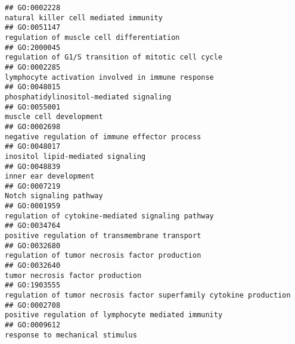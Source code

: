 \documentclass[
]{article}
\begin{document}
\begin{verbatim}
## GO:0002228                                                                                                            natural killer cell mediated immunity
## GO:0051147                                                                                                        regulation of muscle cell differentiation
## GO:2000045                                                                                              regulation of G1/S transition of mitotic cell cycle
## GO:0002285                                                                                                lymphocyte activation involved in immune response
## GO:0048015                                                                                                          phosphatidylinositol-mediated signaling
## GO:0055001                                                                                                                          muscle cell development
## GO:0002698                                                                                                   negative regulation of immune effector process
## GO:0048017                                                                                                                inositol lipid-mediated signaling
## GO:0048839                                                                                                                            inner ear development
## GO:0007219                                                                                                                          Notch signaling pathway
## GO:0001959                                                                                                regulation of cytokine-mediated signaling pathway
## GO:0034764                                                                                                   positive regulation of transmembrane transport
## GO:0032680                                                                                                   regulation of tumor necrosis factor production
## GO:0032640                                                                                                                 tumor necrosis factor production
## GO:1903555                                                                              regulation of tumor necrosis factor superfamily cytokine production
## GO:0002708                                                                                              positive regulation of lymphocyte mediated immunity
## GO:0009612                                                                                                                  response to mechanical stimulus

\end{verbatim}
\end{document}
